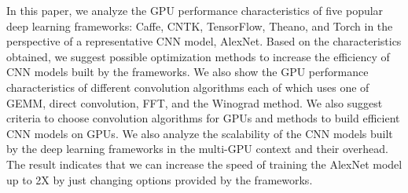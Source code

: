 In this paper, we analyze the GPU performance characteristics of five popular deep learning frameworks: Caffe, CNTK, TensorFlow, Theano, and Torch in the perspective of a representative CNN model, AlexNet. Based on the characteristics obtained, we suggest possible optimization methods to increase the efficiency of CNN models built by the frameworks. We also show the GPU performance characteristics of different convolution algorithms each of which uses one of GEMM, direct convolution, FFT, and the Winograd method. We also suggest criteria to choose convolution algorithms for GPUs and methods to build efficient CNN models on GPUs. We also analyze the scalability of the CNN models built by the deep learning frameworks in the multi-GPU context and their overhead. The result indicates that we can increase the speed of training the AlexNet model up to 2X by just changing options provided by the frameworks. 